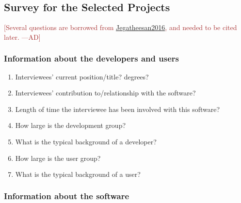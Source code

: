 \documentclass[letterpaper,cleveref]{lipics-v2019}
\newcommand{\authornote}[3]{\textcolor{#1}{[#3 ---#2]}}
\newcommand{\authornote}[3]{}
\newcommand{\ad}[1]{\authornote{brown}{AD}{#1}} %
\theoremstyle{definition}
\begin{document}
\subsection{Survey for the Selected Projects}

\ad{Several questions are borrowed from
  \href{https://gitlab.cas.mcmaster.ca/smiths/pub/-/blob/master/Jegatheesan2016.pdf}{Jegatheesan2016},
  and needed to be cited later.}

\subsubsection{Information about the developers and users}

\begin{enumerate}
\item Interviewees' current position/title? degrees?
\item Interviewees' contribution to/relationship with the software?
\item Length of time the interviewee has been involved with this software?
\item How large is the development group?
\item What is the typical background of a developer?
\item How large is the user group?
\item What is the typical background of a user?
\end{enumerate}

\subsubsection{Information about the software}
\end{document}
